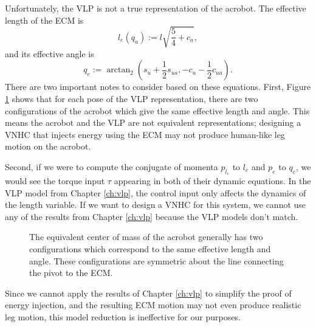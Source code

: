 Unfortunately, the VLP is not a true representation of the acrobot.
The effective length of the ECM is 
\[
    l_e(q_a) := l\sqrt{\frac{5}{4} + c_a}
    ,
\]
and its effective angle is
\[
    q_e := \arctan_2\left(s_u + \frac{1}{2}s_{ua}, -c_u - \frac{1}{2}c_{ua}\right)
    .
\]
There are two important notes to consider based on these equations. 
First, Figure \ref{fig:acrobot-vlp-symmetry} shows that for each pose of the
VLP representation, there are two configurations
of the acrobot which give the same effective length and angle.
This means the acrobot and the VLP are not equivalent representations;
designing a VNHC that injects energy using the ECM may not produce human-like
leg motion on the acrobot.

Second, if we were to compute the conjugate of momenta
\(p_{l_e}\) to \(l_e\) and \(p_e\) to \(q_e\), we would see the torque input
\(\tau\) appearing in both of their dynamic equations.
In the VLP model from Chapter \ref{ch:vlp}, the control input only
affects the dynamics of the length variable.
If we want to design a VNHC for this system, we cannot use any of the results
from Chapter \ref{ch:vlp} because the VLP models don't match.

\begin{figure}
    \centering
    
    \caption{The equivalent center of mass of the acrobot generally has two configurations
        which correspond to the same effective length and angle. These
        configurations are symmetric about the line connecting the pivot to the
        ECM.}
    \label{fig:acrobot-vlp-symmetry}
\end{figure}

Since we cannot apply the results of Chapter \ref{ch:vlp} to simplify the proof
of energy injection, and the resulting ECM motion may not even produce
realistic leg motion, this model reduction is ineffective for our purposes. 

